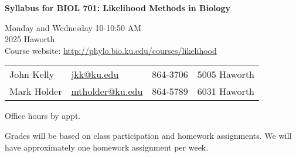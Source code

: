 \documentclass[11pt]{article}
\newcommand{\href}[2]{\url{#2}}
\begin{document}
\pagestyle{empty}

\begin{center}
{\bf \large Syllabus for BIOL 701:  Likelihood Methods in Biology}
\end{center}
Monday and Wednesday 10-10:50 AM\\
2025 Haworth\\
Course website: \url{http://phylo.bio.ku.edu/courses/likelihood}


\begin{table}[h]
\begin{tabular}{llrl}
\hline
John Kelly & \href{mailto:jkk@ku.edu}{jkk@ku.edu}& 864-3706 & 5005 Haworth \\
Mark Holder&  \href{mailto:mtholder@ku.edu}{mtholder@ku.edu}& 864-5789& 6031 Haworth \\
\hline
\end{tabular}
\end{table}%
Office hours by appt.

Grades will be based on class participation and homework assignments. 
We will have approximately one homework assignment per week.
\end{document}
